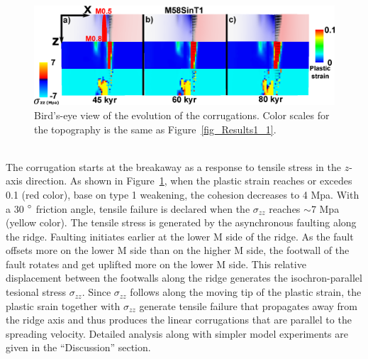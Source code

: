 \begin{figure}[h]
  \centering
    \includegraphics[width=1.0\textwidth]{./Figures/fig_Results_3_2_6_corrugations_evolution.eps}
  \caption[Bird's-eye view of the evolution of the corrugations.]{Bird's-eye view of the evolution of the corrugations. Color scales for the topography is the same as Figure~\hyperref[fig_Results1_1]{\ref{fig_Results1_1}}.}
 \label{fig_Results_3_2_6_corrugations_evolution}
\end{figure}

~\\
The corrugation starts at the breakaway as a response to tensile stress in the $z$-axis direction. As shown in Figure~\hyperref[fig_Results_3_2_6_corrugations_evolution]{\ref{fig_Results_3_2_6_corrugations_evolution}}, when the plastic strain reaches or excedes 0.1 (red color), base on type 1 weakening, the cohesion decreases to 4 Mpa. With a 30 $\degree$ friction angle, tensile failure is declared when the $\sigma_{zz}$ reaches $\sim$7 Mpa (yellow color).
The tensile stress is generated by the asynchronous faulting along the ridge. Faulting initiates earlier at the lower M side of the ridge. As the fault offsets more on the lower M side than on the higher M side, the footwall of the fault rotates and get uplifted more on the lower M side. This relative displacement between the footwalls along the ridge generates the isochron-parallel tesional stress $\sigma_{zz}$. Since $\sigma_{zz}$ follows along the moving tip of the plastic strain, the plastic srain together with $\sigma_{zz}$ generate tensile failure that propagates away from the ridge axis and thus produces the linear corrugations that are parallel to the spreading velocity. Detailed analysis along with simpler model experiments are given in the ``Discussion'' section.   

